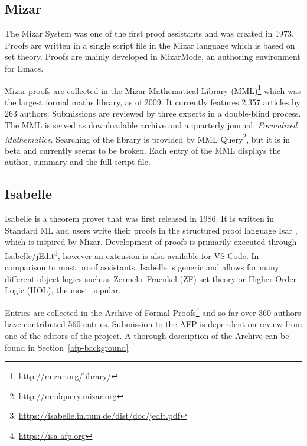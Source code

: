 \documentclass[bsc,frontabs,oneside,singlespacing,parskip,deptreport,logo]{infthesis}
\newcommand{\toupdate}[1]{} %
\begin{document}
\subsection{Mizar}
The Mizar System \cite{MizarOverview} was one of the first proof assistants and was created in 1973. Proofs are written in a single script file in the Mizar language which is based on set theory. Proofs are mainly developed in MizarMode, an authoring environment for Emacs.

Mizar proofs are collected in the Mizar Mathematical Library (MML)\footnote{\url{http://mizar.org/library/}} which was the largest formal maths library, as of 2009. It currently features 2,357 articles by 263 authors\toupdate{http://mmlquery.mizar.org}. Submissions are reviewed by three experts in a double-blind process. The MML is served as downloadable archive and a quarterly journal, \textit{Formalized Mathematics}. Searching of the library is provided by MML Query\footnote{\url{http://mmlquery.mizar.org}}, but it is in beta and currently seems to be broken. Each entry of the MML displays the author, summary and the full script file.
\subsection{Isabelle}
Isabelle \cite{isabelle_system} is a theorem prover that was first released in 1986. It is written in Standard ML \cite{standardML} and users write their proofs in the structured proof language Isar \cite{isabelle_isar}, which is inspired by Mizar. Development of proofs is primarily executed through Isabelle/jEdit\footnote{\url{https://isabelle.in.tum.de/dist/doc/jedit.pdf}}, however an extension is also available for VS Code. In comparison to most proof assistants, Isabelle is generic and allows for many different object logics such as Zermelo–Fraenkel (ZF) set theory or Higher Order Logic (HOL), the most popular. 

Entries are collected in the Archive of Formal Proofs\footnote{\url{https://isa-afp.org}} and so far over 360 authors have contributed 560 entries\toupdate{https://isa-afp.org/statistics.html}. Submission to the AFP is dependent on review from one of the editors of the project. A thorough description of the Archive can be found in Section~\ref{afp-background}
\end{document}
